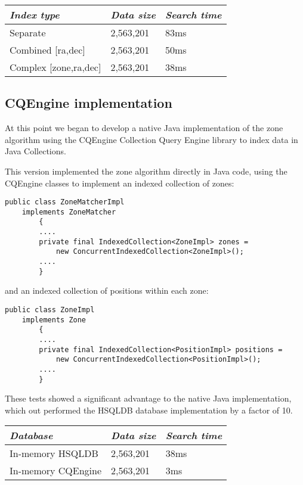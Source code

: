 \documentclass{article}
\newcommand{\hsqldb} {HSQLDB\xspace}
\newcommand{\cqengine} {CQEngine\xspace}
\begin{document}
\begin{table}[h]
\centering
\begin{tabular}{|l|l|l|}
\hline
\textit{Index type} & \textit{Data size} & \textit{Search time} \\ \hline
Separate & 2,563,201 & 83ms \\ \hline
Combined [ra,dec] & 2,563,201 & 50ms \\ \hline
Complex  [zone,ra,dec] & 2,563,201 & 38ms \\ \hline
\end{tabular}
\end{table}

\subsection{CQEngine implementation}
\label{cqengine-implementation}

At this point we began to develop a native Java implementation of the zone algorithm using the \cqengine Collection Query Engine library to index data in Java Collections.

This version implemented the zone algorithm directly in Java code, using the \cqengine classes to implement an indexed collection of zones:

\begin{lstlisting}[style=Java]
    public class ZoneMatcherImpl
    implements ZoneMatcher
        {
        ....
        private final IndexedCollection<ZoneImpl> zones =
            new ConcurrentIndexedCollection<ZoneImpl>();
        ....
        }
\end{lstlisting}

and an indexed collection of positions within each zone:

\begin{lstlisting}[style=Java]
    public class ZoneImpl
    implements Zone
        {
        ....
        private final IndexedCollection<PositionImpl> positions =
            new ConcurrentIndexedCollection<PositionImpl>();
        ....
        }
\end{lstlisting}

These tests showed a significant advantage to the native Java implementation, which out performed the \hsqldb database implementation by a factor of 10.

\begin{table}[h]
\centering
\begin{tabular}{|l|l|l|}
\hline
\textit{Database} & \textit{Data size} & \textit{Search time} \\ \hline
In-memory \hsqldb & 2,563,201 & 38ms \\ \hline
In-memory \cqengine & 2,563,201 & 3ms \\ \hline
\end{tabular}
\end{table}
\end{document}
